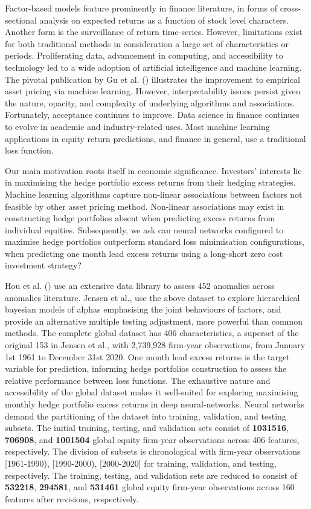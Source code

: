 Factor-based models feature prominently in finance literature, in forms of cross-sectional analysis on expected returns as a function of stock level characters.
Another form is the surveillance of return time-series.
However, limitations exist for both traditional methods in consideration a large set of characteristics or periods.
Proliferating data, advancement in computing, and accessibility to technology led to a wide adoption of artificial intelligence and machine learning.
The pivotal publication by Gu et al. (\citeyear{eapvml}) illustrates the improvement to empirical asset pricing via machine learning.
However, interpretability issues persist given the nature, opacity, and complexity of underlying algorithms and associations.
Fortunately, acceptance continues to improve.
Data science in finance continues to evolve in academic and industry-related uses.
Most machine learning applications in equity return predictions, and finance in general, use a traditional loss function.

Our main motivation roots itself in economic significance.
Investors' interests lie in maximising the hedge portfolio excess returns from their hedging strategies.
Machine learning algorithms capture non-linear associations between factors not feasible by other asset pricing method.
Non-linear associations may exist in constructing hedge portfolios absent when predicting excess returns from individual equities.
Subsequently, we ask can neural networks configured to maximise hedge portfolios outperform standard loss minimisation configurations,
when predicting one month lead excess returns using a long-short zero cost investment strategy?

Hou et al. (\citeyear{hou2020replicating}) use an extensive data library to assess 452 anomalies across anomalies literature.
Jensen et al., \citeyear{jensen2021there} use the above dataset to explore hierarchical bayesian models of alphas emphasising the joint behaviours of factors, 
and provide an alternative multiple testing adjustment, more powerful than common methods.
The complete global dataset has 406 characteristics, a superset of the original 153 in Jensen et al., with 2,739,928 firm-year observations, from January 1st 1961 to December 31st 2020.
One month lead excess returns is the target variable for prediction, informing hedge portfolios construction to assess the relative performance between loss functions.
The exhaustive nature and accessibility of the global dataset makes it well-suited for exploring maximising monthly hedge portfolio excess returns in deep neural-networks.
Neural networks demand the partitioning of the dataset into training, validation, and testing subsets.
The initial training, testing, and validation sets consist of \textbf{1031516}, \textbf{706908}, and \textbf{1001504} global equity firm-year observations across 406 features, respectively.
The division of subsets is chronological with firm-year observations [1961-1990), [1990-2000), [2000-2020] for training, validation, and testing, respectively.
The training, testing, and validation sets are reduced to consist of \textbf{532218}, \textbf{294581}, and \textbf{531461} global equity firm-year observations across 160 features after revisions, respectively.

